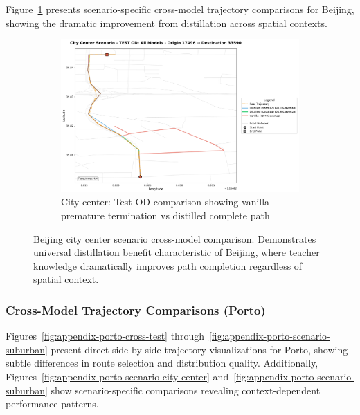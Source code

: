 Figure~\ref{fig:appendix-beijing-scenario-city-center} presents scenario-specific cross-model trajectory comparisons for Beijing, showing the dramatic improvement from distillation across spatial contexts.

\begin{figure}[H]
    \centering
    \begin{subfigure}{0.8\linewidth}
        \centering
        \includegraphics[width=\linewidth]{assets/plots/eval/beijing/scenario_cross_model/test/city_center/test_od_comparison_1_origin17496_dest33590.pdf}
        \caption{City center: Test OD comparison showing vanilla premature termination vs distilled complete path}
    \end{subfigure}
    \caption{Beijing city center scenario cross-model comparison. Demonstrates universal distillation benefit characteristic of Beijing, where teacher knowledge dramatically improves path completion regardless of spatial context.}
    \label{fig:appendix-beijing-scenario-city-center}
\end{figure}

\subsubsection{Cross-Model Trajectory Comparisons (Porto)}
\label{app:cross-model-porto}

Figures~\ref{fig:appendix-porto-cross-test} through~\ref{fig:appendix-porto-scenario-suburban} present direct side-by-side trajectory visualizations for Porto, showing subtle differences in route selection and distribution quality. Additionally, Figures~\ref{fig:appendix-porto-scenario-city-center} and~\ref{fig:appendix-porto-scenario-suburban} show scenario-specific comparisons revealing context-dependent performance patterns.

